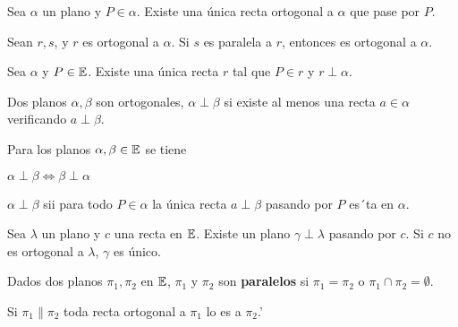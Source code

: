   Sea $\alpha$ un plano y $P \in \alpha$. Existe una única recta ortogonal a $\alpha$ que pase por $P$.
 
  Sean $r,s$, y $r$ es ortogonal a $\alpha$. Si $s$ es paralela a $r$, entonces es ortogonal a $\alpha$.
 
 Sea $\alpha$ y $P \in \mathbb{E}$. Existe una única recta $r$ tal que $P \in r$ y $r\perp \alpha$.  
 
   Dos planos $\alpha, \beta$ son ortogonales, $\alpha \perp \beta$ si existe al menos una recta $a \in \alpha$ verificando $a \perp \beta$.
 
  Para los planos $\alpha, \beta \in \mathbb{E}$ se tiene
 \begin{itemizex}
 	\item $\alpha \perp \beta \iff \beta \perp \alpha$
 	\item $\alpha \perp \beta$ sii para todo $P  \in \alpha$ la única recta $a \perp \beta$ pasando por $P$ es´ta en $\alpha$.
 \end{itemizex}

 Sea $\lambda$ un plano y $c$ una recta en $\mathbb{E}$. Existe un plano $\gamma \perp \lambda$ pasando por $c$. Si $c$ no es ortogonal a $\lambda$, $\gamma$ es único.

 Dados dos planos $\pi_1, \pi_2$ en $\mathbb{E}$, $\pi_1$ y $\pi_2$ son \textbf{paralelos}
 si $\pi_1 = \pi_2$ o $\pi_1 \cap \pi_2 =  \emptyset$.
 
  Si $\pi_1 \parallel \pi_2$ toda recta ortogonal a $\pi_1$ lo es a $\pi_2$.'
 